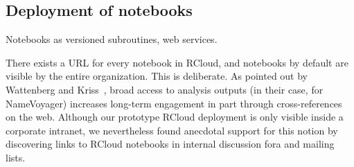 





\subsection{Deployment of notebooks\label{sec:deployment}}

Notebooks as versioned subroutines, web services.

There exists a URL for every notebook in RCloud, and notebooks by
default are visible by the entire organization. This is deliberate.
As pointed out by Wattenberg and Kriss~\cite{Wattenberg:2011:DFS},
broad access to analysis outputs (in their case, for NameVoyager)
increases long-term engagement in part through cross-references on
the web. Although our prototype RCloud deployment is only visible
inside a corporate intranet, we nevertheless found anecdotal support
for this notion by discovering links to RCloud notebooks in internal
discussion fora and mailing lists.
